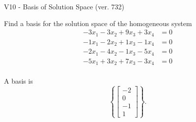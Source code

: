 \begin{exercise}
  \begin{exerciseTitle}V10 - Basis of Solution Space (ver. 732)\end{exerciseTitle}
  \begin{exerciseStatement}
    Find a basis for the solution space of the homogeneous system 
\begin{align*}
 -3 x_ 1 -3 x_ 2 + 9 x_ 3 + 3 x_ 4 &= 0  \\ 
  -1 x_ 1 -2 x_ 2 + 1 x_ 3 -1 x_ 4 &= 0  \\ 
  -2 x_ 1 -4 x_ 2 -1 x_ 3 -5 x_ 4 &= 0  \\ 
  -5 x_ 1 + 3 x_ 2 + 7 x_ 3 -3 x_ 4 &= 0  \\ 
 \end{align*}


 
  \end{exerciseStatement}

  \begin{exerciseAnswer}
   A basis is   
\[\left\{\left[\begin{array}{c}
-2 \\
0 \\
-1 \\
1
\end{array}\right]\right\}.\]

  


  \end{exerciseAnswer}
\end{exercise}